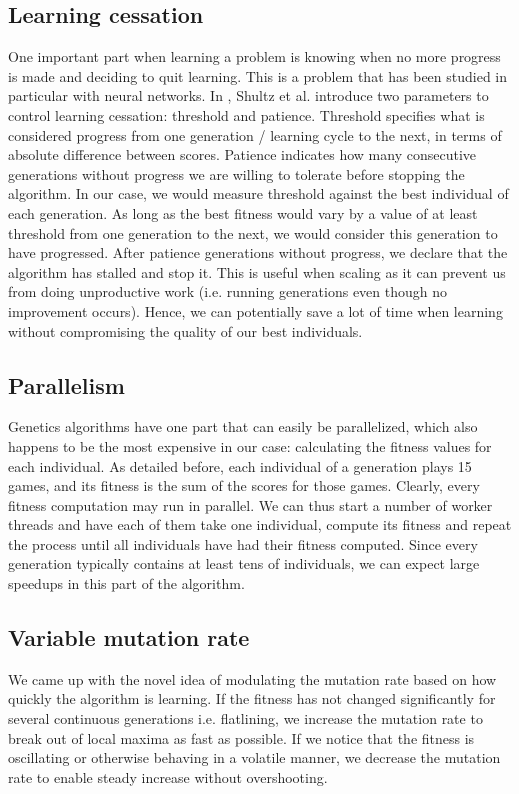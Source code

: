\documentclass[12pt,a4paper]{report}
\begin{document}
\subsection{Learning cessation}
One important part when learning a problem is knowing when no more progress is made and deciding to quit learning. This is a problem that has been studied in particular with neural networks. In \cite{shultz2012knowing}, Shultz et al. introduce two parameters to control learning cessation: threshold and patience. Threshold specifies what is considered progress from one generation / learning cycle to the next, in terms of absolute difference between scores. Patience indicates how many consecutive generations without progress we are willing to tolerate before stopping the algorithm. In our case, we would measure threshold against the best individual of each generation. As long as the best fitness would vary by a value of at least threshold from one generation to the next, we would consider this generation to have progressed. After patience generations without progress, we declare that the algorithm has stalled and stop it. This is useful when scaling as it can prevent us from doing unproductive work (i.e. running generations even though no improvement occurs). Hence, we can potentially save a lot of time when learning without compromising the quality of our best individuals.

\subsection{Parallelism}
Genetics algorithms have one part that can easily be parallelized, which also happens to be the most expensive in our case: calculating the fitness values for each individual. As detailed before, each individual of a generation plays 15 games, and its fitness is the sum of the scores for those games. Clearly, every fitness computation may run in parallel. We can thus start a number of worker threads and have each of them take one individual, compute its fitness and repeat the process until all individuals have had their fitness computed. Since every generation typically contains at least tens of individuals, we can expect large speedups in this part of the algorithm.

\subsection{Variable mutation rate}
We came up with the novel idea of modulating the mutation rate based on how quickly the algorithm is learning. If the fitness has not changed significantly for several continuous generations i.e. flatlining, we increase the mutation rate to break out of local maxima as fast as possible. If we notice that the fitness is oscillating or otherwise behaving in a volatile manner, we decrease the mutation rate to enable steady increase without overshooting.
\end{document}
